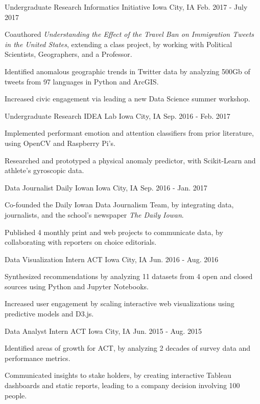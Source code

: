 \begin{cventries}
\cventry
  {Undergraduate Research}
  {Informatics Initiative}
  {Iowa City, IA}
  {Feb. 2017 - July 2017}
  {
    \begin{cvitems}
      \item {Coauthored \textit{Understanding the Effect of the Travel Ban on Immigration Tweets in the United States}, extending a class project, by working with Political Scientists, Geographers, and a Professor.}
      \item {Identified anomalous geographic trends in Twitter data by analyzing 500Gb of tweets from 97 languages in Python and ArcGIS.}
      \item {Increased civic engagement via leading a new Data Science summer workshop.}
    \end{cvitems}
  }
  \cventry
    {Undergraduate Research}
    {IDEA Lab}
    {Iowa City, IA}
    {Sep. 2016 - Feb. 2017}
    {
      \begin{cvitems}
        \item{Implemented performant emotion and attention classifiers from prior literature, using OpenCV and Raspberry Pi's.}
        \item {Researched and prototyped a physical anomaly predictor, with Scikit-Learn and athlete's gyroscopic data. }
      \end{cvitems}
    }
  \cventry
    {Data Journalist}
    {Daily Iowan}
    {Iowa City, IA}
    {Sep. 2016 - Jan. 2017}
    {
      \begin{cvitems}
        \item {Co-founded the Daily Iowan Data Journalism Team, by integrating data, journalists, and the school's newspaper \textit{The Daily Iowan}.}
        \item {Published 4 monthly print and web projects to communicate data, by collaborating with reporters on choice editorials.}
      \end{cvitems}
    }
  \cventry
    {Data Visualization Intern}
    {ACT}
    {Iowa City, IA}
    {Jun. 2016 - Aug. 2016}
    {
      \begin{cvitems}
        \item {Synthesized recommendations by analyzing 11 datasets from 4 open and closed sources using Python and Jupyter Notebooks. }
        \item {Increased user engagement by scaling interactive web visualizations using predictive models and D3.js.}
      \end{cvitems}
    }
  \cventry
    {Data Analyst Intern}
    {ACT}
    {Iowa City, IA}
    {Jun. 2015 - Aug. 2015}
    {
      \begin{cvitems}
        \item {Identified areas of growth for ACT, by analyzing 2 decades of survey data and performance metrics.}
        \item {Communicated insights to stake holders, by creating interactive Tableau dashboards and static reports, leading to a company decision involving 100 people.}
      \end{cvitems}
    }

\end{cventries}
